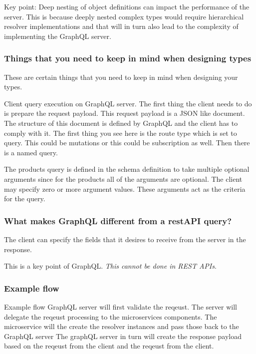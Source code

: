 \begin{note}
    Key point: Deep nesting of object definitions can impact the performance of the server. %
    This is because deeply nested complex types would require hierarchical resolver implementations and that will in turn also lead to the complexity of implementing the GraphQL server.
\end{note}

\subsubsection{Things that you need to keep in mind when designing types}

These are certain things that you need to keep in mind when designing your types.

Client query execution on GraphQL server.
The first thing the client needs to do is prepare the request payload.
This request payload is a JSON like document.
The structure of this document is defined by GraphQL and the client has to comply with it.
The first thing you see here is the route type which is set to query.
This could be mutations or this could be subscription as well.
Then there is a named query.

The products query is defined in the schema definition to take multiple optional arguments since for the products all of the arguments are optional.
The client may specify zero or more argument values.
These arguments act as the criteria for the query.

\subsubsection{What makes GraphQL different from a restAPI query?}
The client can specify the fields that it desires to receive from the server in the response.

\begin{note}
    This is a key point of GraphQL. \textit{This cannot be done in REST APIs}.
\end{note}

\subsubsection{Example flow}
Example flow
GraphQL server will first validate the reqeust.
The server will delegate the reqeust processing to the microservices components.
The microservice will the create the resolver instances and pass those back to the GraphQL server
The graphQL server in turn will create the response payload based on the reqeust from the client and the reqeust from the client.

